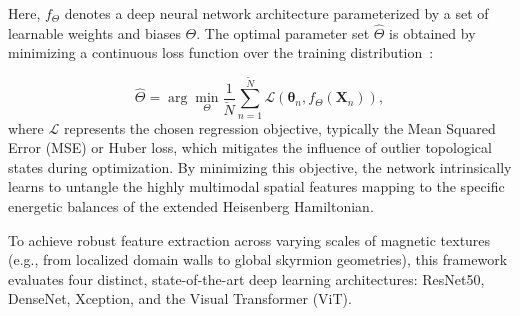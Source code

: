 \documentclass[final,5p,times,twocolumn]{elsarticle}
\begin{document}
Here, $f_\Theta$ denotes a deep neural network architecture parameterized by a set of learnable weights and biases $\Theta$. The optimal parameter set $\hat{\Theta}$ is obtained by minimizing a continuous loss function over the training distribution~\cite{murphy2023probabilistic}:

\begin{equation}\label{eq:LossFunction}
\hat{\Theta} = \arg\min_{\Theta} \frac{1}{\breve{N}} \sum_{n=1}^{\breve{N}} \mathcal{L}\left(\boldsymbol{\theta}_n, f_\Theta(\mathbf{X}_n)\right),
\end{equation}
where $\mathcal{L}$ represents the chosen regression objective, typically the Mean Squared Error (MSE) or Huber loss, which mitigates the influence of outlier topological states during optimization. By minimizing this objective, the network intrinsically learns to untangle the highly multimodal spatial features mapping to the specific energetic balances of the extended Heisenberg Hamiltonian.

To achieve robust feature extraction across varying scales of magnetic textures (e.g., from localized domain walls to global skyrmion geometries), this framework evaluates four distinct, state-of-the-art deep learning architectures: ResNet50, DenseNet, Xception, and the Visual Transformer (ViT).
\end{document}

